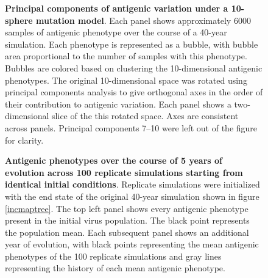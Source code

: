 \begin{figure}[!c]
	\centering
	\caption{\textbf{Principal components of antigenic variation under a 10-sphere mutation model}. Each panel shows approximately 6000 samples of antigenic phenotype over the course of a 40-year simulation.  Each phenotype is represented as a bubble, with bubble area proportional to the number of samples with this phenotype.  Bubbles are colored based on clustering the 10-dimensional antigenic phenotypes.  The original 10-dimensional space was rotated using principal components analysis to give orthogonal axes in the order of their contribution to antigenic variation.  Each panel shows a two-dimensional slice of the this rotated space.  Axes are consistent across panels.  Principal components 7--10 were left out of the figure for clarity.}
	\label{10dgrid}
\end{figure}

\pagebreak

\begin{figure}[!c]
	\centering
	\caption{\textbf{Antigenic phenotypes over the course of 5 years of evolution across 100 replicate simulations starting from identical initial conditions}.  Replicate simulations were initialized with the end state of the original 40-year simulation shown in figure \ref{incmaptree}.  The top left panel shows every antigenic phenotype present in the initial virus population.  The black point represents the population mean.  Each subsequent panel shows an additional year of evolution, with black points representing the mean antigenic phenotypes of the 100 replicate simulations and gray lines representing the history of each mean antigenic phenotype.}
	\label{replicateevolfull}
\end{figure}

